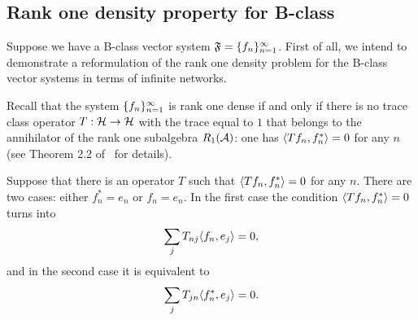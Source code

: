 \documentclass[12pt,oneside,a4paper]{amsart}
\begin{document}
    \medskip
    \subsection{Rank one density property for B-class}
      Suppose we have a B-class vector system $\fsys=\seq{f}$.
      First of all, we intend to demonstrate a reformulation of the rank one density problem for
        the B-class vector systems in terms of infinite networks.

      Recall that the system $\seq{f}$ is rank one dense
        if and only if there is no trace class operator $T: \cal{H} \to \cal{H}$ with the trace equal to $1$
        that belongs to the annihilator of the rank one subalgebra $R_1(\cal{A})$: one has $\inner{Tf_n}{f_n^*} = 0$ for any $n$
        (see Theorem 2.2 of~\cite{katavolos} for details).

      Suppose that there is an operator $T$ such that $\inner{Tf_n}{f_n^*} = 0$ for any $n$.
      There are two cases: either $f^*_n = e_n$ or $f_n = e_n$.
      In the first case the condition $\inner{Tf_n}{f_n^*} = 0$ turns into
      \begin{equation}
          \label{left-eqn}
          \sum_j T_{nj} \inner{f_n}{e_j} = 0,
      \end{equation}
      and in the second case it is equivalent to
      \begin{equation}
          \label{right-eqn}
          \sum_j T_{jn} \inner{f^*_n}{e_j} = 0.
      \end{equation}
\end{document}
